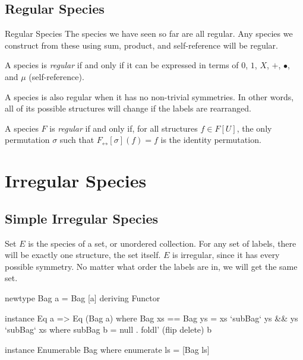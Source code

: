 \documentclass{beamer}
\begin{document}
\subsection{Regular Species}
\begin{frame}{Regular Species}
  The species we have seen so far are all regular. Any species we construct from these using sum,
  product, and self-reference will be regular.

  \begin{definition}
    A species is \emph{regular} if and only if it can be expressed in terms of \( 0 \), \( 1 \), \( X \),
    \( + \), \( \bullet \), and \( \mu \) (self-reference).~\cite{yorgey}
  \end{definition}

  \vfill
  \pause{}

  A species is also regular when it has no non-trivial symmetries. In other words, all of its
  possible structures will change if the labels are rearranged.

  \begin{definition}
    A species \( F \) is \emph{regular} if and only if, for all structures \( f \in F[U] \), the
    only permutation \(\sigma \) such that \( F_\leftrightarrow [\sigma] (f) = f \) is the identity
    permutation.~\cite{yorgey}
  \end{definition}
\end{frame}

\section{Irregular Species}
\subsection{Simple Irregular Species}
\begin{frame}[fragile]{Set}
  \( E \) is the species of a set, or unordered collection. For any set of labels, there will be
  exactly one structure, the set itself. \( E \) is irregular, since it has every possible symmetry.
  No matter what order the labels are in, we will get the same set.

  \vfill
  \pause{}

  \begin{code}
newtype Bag a = Bag [a]
  deriving Functor

instance Eq a => Eq (Bag a) where
  Bag xs == Bag ys = xs `subBag` ys && ys `subBag` xs
    where subBag b = null . foldl' (flip delete) b

instance Enumerable Bag where
  enumerate ls = [Bag ls]
\end{code}
\end{frame}
\end{document}
